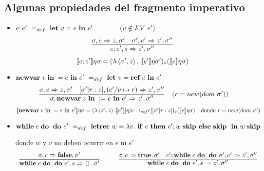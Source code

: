     \subsection{Algunas propiedades del fragmento imperativo}
      \begin{itemize}
        \item $e;e'\ =_{def}\ \textbf{let}\ v=e \ \mathbf{in}\  e'\qquad\qquad(v\notin FV\ e')$
          \[\begin{array}{c}
            \underline{\sigma,e \Rightarrow z,\sigma'\quad \sigma',e' \Rightarrow z',\sigma''}\\
            e;e',s \Rightarrow z',\sigma''
            \end{array}
          \]
          \[
          \se{e;e'}\eta\s = (\lambda \la\s',z\ra.\ \se{e'}\eta\s')_*(\se{e}\eta\s)
          \]
        \item $\newvar v=e\ine e'\ =_{def}\ \textbf{let}\ v=\textbf{ref}\ e \ine e'$
          \[\begin{array}{c}
          \underline{\sigma,e \Rightarrow z,\sigma'\quad [\sigma'|r:z],(e'/v\mapsto r) \Rightarrow z',\sigma''}\\
          \sigma,\textbf{newvar}\;v\;\textbf{in}\;:=e\ \mathbf{in}\  e' \Rightarrow z',\sigma''
          \end{array}
          \ \ (r=new(dom\ \sigma'))
          \]
          \[
          [\![\textbf{newvar}\;v\;\textbf{in}\;=e\ \mathbf{in}\  e']\!]\eta\sigma = (\lambda \left\langle \sigma', z\right\rangle.[\![e']\!][\eta|v:\iota_{ref}r][\sigma'|r:z])_{*}([\![e]\!]\eta\sigma)\quad\text{donde } r = new(dom\  \sigma') 
          \]
        \item $\while e\doc e'\ =_{def}\ \textbf{letrec}\ w=\lambda v.\ \ife e\thene e';w\;\textbf{skip}\elsee \textbf{skip}\ \ine w\; \textbf{skip}$
        
        donde $w$ y $v$ no deben ocurrir en $e$ ni $e'$
        \[\begin{array}{c}
          \sigma,e \Rightarrow \textbf{false},\sigma'\\
          \overline{\textbf{while}\;e\;\textbf{do}\;\ \mathbf{do}\  e',s \Rightarrow \left\langle\right\rangle,\sigma'}
          \end{array}
          \qquad
          \begin{array}{c}
          \underline{\sigma,e \Rightarrow \textbf{true},\sigma'\quad e';\textbf{while}\;e\;\textbf{do}\;\ \mathbf{do}\  \sigma',e' \Rightarrow z',\sigma''}\\
          \textbf{while}\;e\;\textbf{do}\;\ \mathbf{do}\  e',s \Rightarrow z',\sigma''
          \end{array}
          \]
      \end{itemize}

